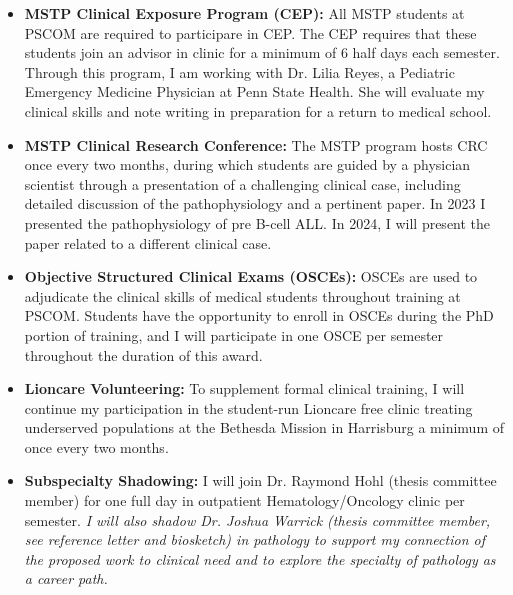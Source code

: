 \documentclass{NIHGrant}
\begin{document}
\begin{itemize}[leftmargin=*, nosep]
  \item \textbf{MSTP Clinical Exposure Program (CEP):} All MSTP students at PSCOM are required to participare in CEP. The CEP requires that these students join an advisor in clinic for a minimum of 6 half days each semester. Through this program, I am working with Dr. Lilia Reyes, a Pediatric Emergency Medicine Physician at Penn State Health. She will evaluate my clinical skills and note writing in preparation for a return to medical school.
  \item \textbf{MSTP Clinical Research Conference:} The MSTP program hosts CRC once every two months, during which students are guided by a physician scientist through a presentation of a challenging clinical case, including detailed discussion of the pathophysiology and a pertinent paper. In 2023 I presented the pathophysiology of pre B-cell ALL. In 2024, I will present the paper related to a different clinical case.
  \item \textbf{Objective Structured Clinical Exams (OSCEs):} OSCEs are used to adjudicate the clinical skills of medical students throughout training at PSCOM. Students have the opportunity to enroll in OSCEs during the PhD portion of training, and I will participate in one OSCE per semester throughout the duration of this award.
  \item \textbf{Lioncare Volunteering:} To supplement formal clinical training, I will continue my participation in the student-run Lioncare free clinic treating underserved populations at the Bethesda Mission in Harrisburg a minimum of once every two months.
  \item \textbf{Subspecialty Shadowing:} I will join Dr. Raymond Hohl (thesis committee member) for one full day in outpatient Hematology/Oncology clinic per semester. \emph{I will also shadow Dr. Joshua Warrick (thesis committee member, see reference letter and biosketch) in pathology to support my connection of the proposed work to clinical need and to explore the specialty of pathology as a career path.}
\end{itemize}
\end{document}
